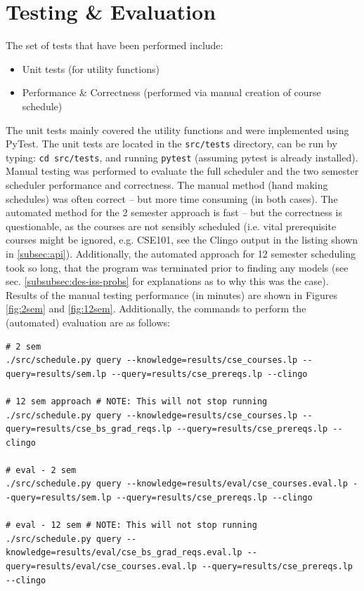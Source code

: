\documentclass[12pt]{article}
\begin{document}
    \section{Testing \& Evaluation}
    \label{sec:test-eval}

    The set of tests that have been performed include: 

    \begin{itemize}
        \item Unit tests (for utility functions)
        \item Performance \& Correctness (performed via manual creation of course schedule)
    \end{itemize}

    The unit tests mainly covered the utility functions and were implemented using PyTest. The unit tests are located in the {\tt{src/tests}} directory, can be run by typing: {\tt{cd src/tests}}, and running {\tt{pytest}} (assuming pytest is already installed). Manual testing was performed to evaluate the full scheduler and the two semester scheduler performance and correctness. The manual method (hand making schedules) was often correct -- but more time consuming (in both cases). The automated method for the 2 semester approach is fast -- but the correctness is questionable, as the courses are not sensibly scheduled (i.e. vital prerequisite courses might be ignored, e.g. CSE101, see the Clingo output in the listing shown in \ref{subsec:api}). Additionally, the automated approach for 12 semester scheduling took so long, that the program was terminated prior to finding any models (see sec. \ref{subsubsec:des-iss-probs} for explanations as to why this was the case). Results of the manual testing performance (in minutes) are shown in Figures \ref{fig:2sem} and \ref{fig:12sem}. Additionally, the commands to perform the (automated) evaluation are as follows: \\

    \begin{lstlisting}
# 2 sem
./src/schedule.py query --knowledge=results/cse_courses.lp --query=results/sem.lp --query=results/cse_prereqs.lp --clingo

# 12 sem approach # NOTE: This will not stop running
./src/schedule.py query --knowledge=results/cse_courses.lp --query=results/cse_bs_grad_reqs.lp --query=results/cse_prereqs.lp --clingo

# eval - 2 sem
./src/schedule.py query --knowledge=results/eval/cse_courses.eval.lp --query=results/sem.lp --query=results/cse_prereqs.lp --clingo

# eval - 12 sem # NOTE: This will not stop running
./src/schedule.py query --knowledge=results/eval/cse_bs_grad_reqs.eval.lp --query=results/eval/cse_courses.eval.lp --query=results/cse_prereqs.lp --clingo
    \end{lstlisting}
\end{document}
